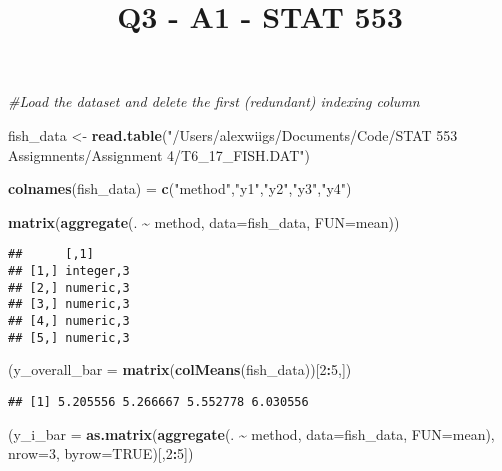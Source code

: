 \documentclass[
]{article}
\title{Q3 - A1 - STAT 553}
\author{}
\date{\vspace{-2.5em}}
\newenvironment{Shaded}{\begin{snugshade}}{\end{snugshade}}
\newcommand{\AttributeTok}[1]{\textcolor[rgb]{0.13,0.29,0.53}{#1}}
\newcommand{\CommentTok}[1]{\textcolor[rgb]{0.56,0.35,0.01}{\textit{#1}}}
\newcommand{\ConstantTok}[1]{\textcolor[rgb]{0.56,0.35,0.01}{#1}}
\newcommand{\DecValTok}[1]{\textcolor[rgb]{0.00,0.00,0.81}{#1}}
\newcommand{\FunctionTok}[1]{\textcolor[rgb]{0.13,0.29,0.53}{\textbf{#1}}}
\newcommand{\NormalTok}[1]{#1}
\newcommand{\OtherTok}[1]{\textcolor[rgb]{0.56,0.35,0.01}{#1}}
\newcommand{\SpecialCharTok}[1]{\textcolor[rgb]{0.81,0.36,0.00}{\textbf{#1}}}
\newcommand{\StringTok}[1]{\textcolor[rgb]{0.31,0.60,0.02}{#1}}
\begin{document}
\maketitle

\begin{Shaded}
\begin{Highlighting}[]
\CommentTok{\#Load the dataset and delete the first (redundant) indexing column}


\NormalTok{fish\_data }\OtherTok{\textless{}{-}} \FunctionTok{read.table}\NormalTok{(}\StringTok{"/Users/alexwiigs/Documents/Code/STAT 553 Assigmnents/Assignment 4/T6\_17\_FISH.DAT"}\NormalTok{)}

\FunctionTok{colnames}\NormalTok{(fish\_data) }\OtherTok{=} \FunctionTok{c}\NormalTok{(}\StringTok{"method"}\NormalTok{,}\StringTok{"y1"}\NormalTok{,}\StringTok{"y2"}\NormalTok{,}\StringTok{"y3"}\NormalTok{,}\StringTok{"y4"}\NormalTok{)}

\FunctionTok{matrix}\NormalTok{(}\FunctionTok{aggregate}\NormalTok{(. }\SpecialCharTok{\textasciitilde{}}\NormalTok{ method, }\AttributeTok{data=}\NormalTok{fish\_data, }\AttributeTok{FUN=}\NormalTok{mean))}
\end{Highlighting}
\end{Shaded}

\begin{verbatim}
##      [,1]     
## [1,] integer,3
## [2,] numeric,3
## [3,] numeric,3
## [4,] numeric,3
## [5,] numeric,3
\end{verbatim}

\begin{Shaded}
\begin{Highlighting}[]
\NormalTok{(}\AttributeTok{y\_overall\_bar =} \FunctionTok{matrix}\NormalTok{(}\FunctionTok{colMeans}\NormalTok{(fish\_data))[}\DecValTok{2}\SpecialCharTok{:}\DecValTok{5}\NormalTok{,])}
\end{Highlighting}
\end{Shaded}

\begin{verbatim}
## [1] 5.205556 5.266667 5.552778 6.030556
\end{verbatim}

\begin{Shaded}
\begin{Highlighting}[]
\NormalTok{(}\AttributeTok{y\_i\_bar =} \FunctionTok{as.matrix}\NormalTok{(}\FunctionTok{aggregate}\NormalTok{(. }\SpecialCharTok{\textasciitilde{}}\NormalTok{ method, }\AttributeTok{data=}\NormalTok{fish\_data, }\AttributeTok{FUN=}\NormalTok{mean), }\AttributeTok{nrow=}\DecValTok{3}\NormalTok{, }\AttributeTok{byrow=}\ConstantTok{TRUE}\NormalTok{)[,}\DecValTok{2}\SpecialCharTok{:}\DecValTok{5}\NormalTok{])}
\end{Highlighting}
\end{Shaded}
\end{document}
